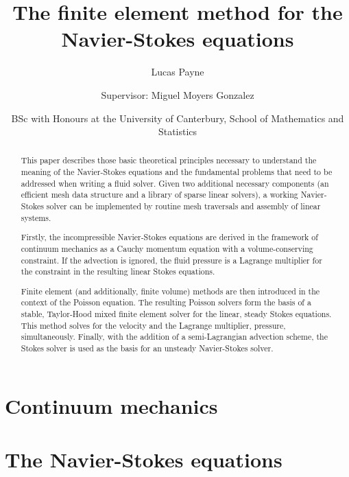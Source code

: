 \documentclass[11pt,a4paper]{memoir}
\begin{document}
\title{\Huge \textbf{The finite element method for the Navier-Stokes equations}}
\author{Lucas Payne
\and Supervisor: Miguel Moyers Gonzalez
\and {\small BSc with Honours at the University of Canterbury, School of Mathematics and Statistics}
}

\maketitle

\renewcommand{\abstractname}{}
\begin{abstract}
This paper describes those basic theoretical principles necessary to understand
the meaning of the Navier-Stokes equations and the fundamental problems that need to be addressed when writing a fluid solver.
Given two additional necessary components (an efficient mesh data structure and a library of sparse linear solvers),
a working Navier-Stokes solver can be implemented by routine mesh traversals and assembly of linear systems.

Firstly, the incompressible Navier-Stokes equations are derived in the framework of continuum mechanics as a Cauchy momentum equation
with a volume-conserving constraint. If the advection is ignored, the fluid pressure is a Lagrange multiplier
for the constraint in the resulting linear Stokes equations.


Finite element (and additionally, finite volume) methods are then introduced in the context of the Poisson equation.
The resulting Poisson solvers form the basis of a stable, Taylor-Hood mixed finite element solver for the linear, steady Stokes equations.
This method solves for the velocity and the Lagrange multiplier, pressure, simultaneously.
Finally, with the addition of a semi-Lagrangian advection scheme, the Stokes solver is used as the basis for an unsteady Navier-Stokes solver.
\end{abstract}

\newpage
\tableofcontents

\chapter{Continuum mechanics}


\chapter{The Navier-Stokes equations}

\end{document}
